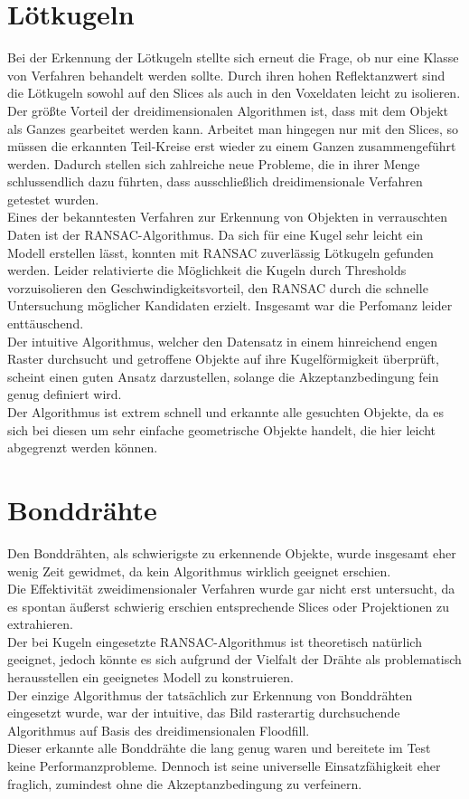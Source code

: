 \section{Lötkugeln}
Bei der Erkennung der Lötkugeln stellte sich erneut die Frage, ob nur eine Klasse von Verfahren behandelt werden sollte. Durch ihren hohen Reflektanzwert sind die Lötkugeln sowohl auf den Slices als auch in den Voxeldaten leicht zu isolieren. Der größte Vorteil der dreidimensionalen Algorithmen ist, dass mit dem Objekt als Ganzes gearbeitet werden kann. Arbeitet man hingegen nur mit den Slices, so müssen die erkannten Teil-Kreise erst wieder zu einem Ganzen zusammengeführt werden. Dadurch stellen sich zahlreiche neue Probleme, die in ihrer Menge schlussendlich dazu führten, dass ausschließlich dreidimensionale Verfahren getestet wurden. \\
Eines der bekanntesten Verfahren zur Erkennung von Objekten in verrauschten Daten ist der RANSAC-Algorithmus. Da sich für eine Kugel sehr leicht ein Modell erstellen lässt, konnten mit RANSAC zuverlässig Lötkugeln gefunden werden. Leider relativierte die Möglichkeit die Kugeln durch Thresholds vorzuisolieren den Geschwindigkeitsvorteil, den RANSAC durch die schnelle Untersuchung möglicher Kandidaten erzielt. Insgesamt war die Perfomanz leider enttäuschend. \\
Der intuitive Algorithmus, welcher den Datensatz in einem hinreichend engen Raster durchsucht und getroffene Objekte auf ihre Kugelförmigkeit überprüft, scheint einen guten Ansatz darzustellen, solange die Akzeptanzbedingung fein genug definiert wird. \\
Der Algorithmus ist extrem schnell und erkannte alle gesuchten Objekte, da es sich bei diesen um sehr einfache geometrische Objekte handelt, die hier leicht abgegrenzt werden können.
\section{Bonddrähte}
Den Bonddrähten, als schwierigste zu erkennende Objekte, wurde insgesamt eher wenig Zeit gewidmet, da kein Algorithmus wirklich geeignet erschien.\\
Die Effektivität zweidimensionaler Verfahren wurde gar nicht erst untersucht, da es spontan äußerst schwierig erschien entsprechende Slices oder Projektionen zu extrahieren. \\
Der bei Kugeln eingesetzte RANSAC-Algorithmus ist theoretisch natürlich geeignet, jedoch könnte es sich aufgrund der Vielfalt der Drähte als problematisch herausstellen ein geeignetes Modell zu konstruieren. \\
Der einzige Algorithmus der tatsächlich zur Erkennung von Bonddrähten eingesetzt wurde, war der intuitive, das Bild rasterartig durchsuchende Algorithmus auf Basis des dreidimensionalen Floodfill. \\
Dieser erkannte alle Bonddrähte die lang genug waren und bereitete im Test keine Performanzprobleme. Dennoch ist seine universelle Einsatzfähigkeit eher fraglich, zumindest ohne die Akzeptanzbedingung zu verfeinern.

